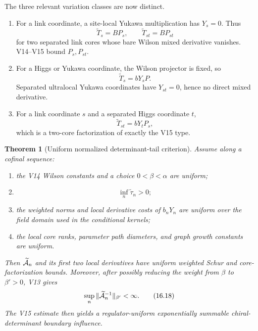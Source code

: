 \documentclass[11pt]{article}
\newtheorem{theorem}{Theorem}[section]
\theoremstyle{remark}
\begin{document}
The three relevant variation classes are now distinct.

\begin{enumerate}
\item For a link coordinate, a site-local Yukawa multiplication has
      \(Y_s=0\).  Thus
      \[
       \widetilde T_s=BP_s,\qquad
       \widetilde T_{st}=BP_{st}                            \tag{16.14}
      \]
      for two separated link cores whose bare Wilson mixed
      derivative vanishes.  V14--V15 bound \(P_s,P_{st}\).

\item For a Higgs or Yukawa coordinate, the Wilson projector is
      fixed, so
      \[
       \widetilde T_s=bY_sP.                                \tag{16.15}
      \]
      Separated ultralocal Yukawa coordinates have
      \(Y_{st}=0\), hence no direct mixed derivative.

\item For a link coordinate \(s\) and a separated Higgs coordinate
      \(t\),
      \[
       \widetilde T_{st}=bY_tP_s,                           \tag{16.16}
      \]
      which is a two-core factorization of exactly the V15 type.
\end{enumerate}

\begin{theorem}[Uniform normalized determinant-tail criterion]
\label{thm:v15v16-tail-criterion}
Assume along a cofinal sequence:
\begin{enumerate}
\item the V14 Wilson constants and a choice \(0<\beta<\alpha\) are
      uniform;
\item
      \[
       \inf_n\widetilde\tau_n>0;                            \tag{16.17}
      \]
\item the weighted norms and local derivative costs of
      \(b_nY_n\) are uniform over the field domain used in the
      conditional kernels;
\item the local core ranks, parameter path diameters, and graph
      growth constants are uniform.
\end{enumerate}
Then \(\widetilde{\cal A}_n\) and its first two local derivatives
have uniform weighted Schur and core-factorization bounds.
Moreover, after possibly reducing the weight from \(\beta\) to
\(\beta'>0\), V13 gives
\[
 \sup_n\|\widetilde{\cal A}_n^{-1}\|_{\beta'}<\infty.        \tag{16.18}
\]
The V15 estimate then yields a regulator-uniform exponentially
summable chiral-determinant boundary influence.
\end{theorem}
\end{document}
